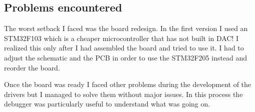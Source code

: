 \subsection{Problems encountered}

The worst setback I faced was the board redesign. In the first version I used an STM32F103 which is a cheaper microcontroller that has not built in DAC! I realized this only after I had assembled the board and tried to use it. I had to adjust the schematic and the PCB in order to use the STM32F205 instead and reorder the board.

Once the board was ready I faced other problems during the development of the drivers but I managed to solve them without major issues. In this process the debugger was particularly useful to understand what was going on.
